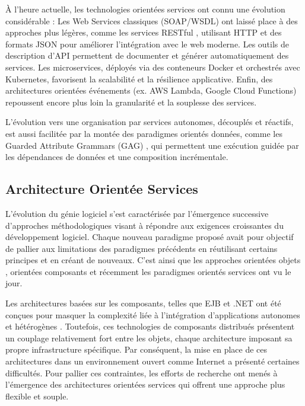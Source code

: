 À l'heure actuelle, les technologies orientées services ont connu une évolution considérable :
Les Web Services classiques (SOAP/WSDL) ont laissé place à des approches plus légères, comme les services RESTful \cite{fielding2000architectural}, utilisant HTTP et des formats JSON pour améliorer l’intégration avec le web moderne.
Les outils de description d’API permettent de documenter et générer automatiquement des services.
Les microservices, déployés via des conteneurs Docker et orchestrés avec Kubernetes, favorisent la scalabilité et la résilience applicative.
Enfin, des architectures orientées événements (ex. AWS Lambda, Google Cloud Functions) \cite{jonas2019cloud} repoussent encore plus loin la granularité et la souplesse des services.

L’évolution vers une organisation par services autonomes, découplés et réactifs, est aussi facilitée par la montée des paradigmes orientés données, comme les Guarded Attribute Grammars (GAG) \cite{badouel2015active}, qui permettent une exécution guidée par les dépendances de données et une composition incrémentale.

\label{sec:calcul_orientee_service}

\subsection{Architecture Orientée Services}{}
\label{subsec:evolution_high_performance}

L'évolution du génie logiciel s'est caractérisée par l'émergence successive d'approches méthodologiques visant à répondre aux exigences croissantes du développement logiciel. Chaque nouveau paradigme proposé avait pour objectif de pallier aux limitations des paradigmes précédents en réutilisant certains principes et en créant de nouveaux. C’est ainsi que les approches orientées objets \cite{taylor1990object}, orientées composants \cite{szyperski2002component} et récemment les paradigmes orientés services ont vu le jour.

Les architectures basées sur les composants, telles que EJB et .NET ont été conçues pour masquer la complexité liée à l'intégration d'applications autonomes et hétérogènes \cite{vinoski2004overview}. Toutefois, ces technologies de composants distribués présentent un couplage relativement fort entre les objets, chaque architecture imposant sa propre infrastructure spécifique. Par conséquent, la mise en place de ces architectures dans un environnement ouvert comme Internet a présenté certaines difficultés. Pour pallier ces contraintes, les efforts de recherche ont menés à l’émergence des architectures orientées services qui offrent une approche plus flexible et souple.

